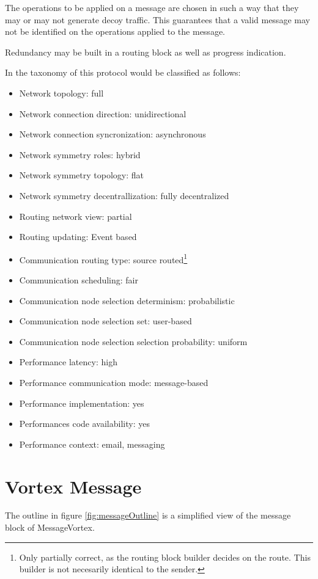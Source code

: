 The operations to be applied on a message are chosen in such a way that they may or may not generate decoy traffic. This guarantees that a valid message may not be identified on the operations applied to the message.

Redundancy may be built in a routing block as well as progress indication.

In the taxonomy of \cite{Shirazi2018} this protocol would be classified as follows:

\begin{itemize}
	\item Network topology: full
	\item Network connection direction: unidirectional
	\item Network connection syncronization: asynchronous
	\item Network symmetry roles: hybrid
	\item Network symmetry topology: flat
	\item Network symmetry decentrallization: fully decentralized
	\item Routing network view: partial
	\item Routing updating: Event based
	\item Communication routing type: source routed\footnote{Only partially correct, as the routing block builder decides on the route. This builder is not necesarily identical to the sender.}
	\item Communication scheduling: fair
	\item Communication node selection determinism: probabilistic
	\item Communication node selection set: user-based
	\item Communication node selection selection probability: uniform
	\item Performance latency: high
	\item Performance communication mode: message-based
	\item Performance implementation: yes
	\item Performances code availability: yes
	\item Performance context: email, messaging
\end{itemize}

\section{Vortex Message}
The outline in figure \ref{fig:messageOutline} is a simplified view of the message block of MessageVortex.

